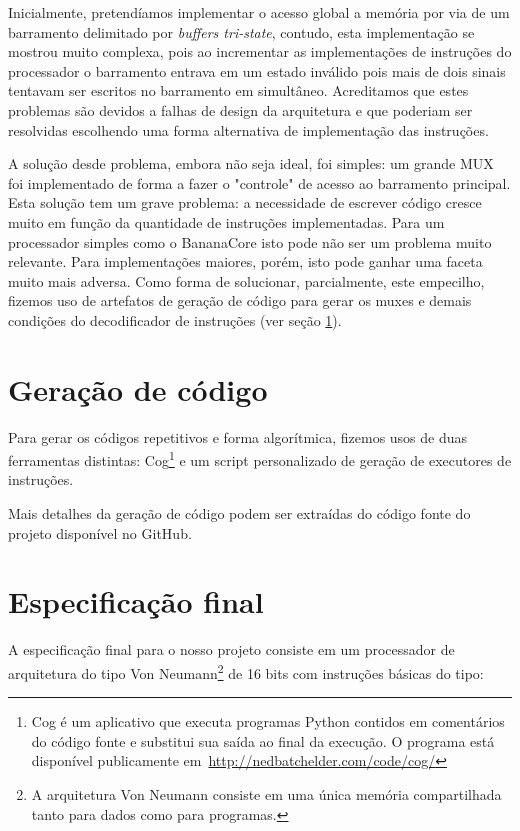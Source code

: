 \documentclass[11pt]{report}
\begin{document}
Inicialmente, pretendíamos implementar o acesso global a memória por via de um barramento delimitado por \emph{buffers tri-state}, contudo, esta implementação se mostrou muito complexa, pois ao incrementar as implementações de instruções do processador o barramento entrava em um estado inválido pois mais de dois sinais tentavam ser escritos no barramento em simultâneo. Acreditamos que estes problemas são devidos a falhas de design da arquitetura e que poderiam ser resolvidas escolhendo uma forma alternativa de implementação das instruções.

A solução desde problema, embora não seja ideal, foi simples: um grande MUX foi implementado de forma a fazer o "controle" de acesso ao barramento principal. Esta solução tem um grave problema: a necessidade de escrever código cresce muito em função da quantidade de instruções implementadas. Para um processador simples como o BananaCore isto pode não ser um problema muito relevante. Para implementações maiores, porém, isto pode ganhar uma faceta muito mais adversa. Como forma de solucionar, parcialmente, este empecilho, fizemos uso de artefatos de geração de código para gerar os muxes e demais condições do decodificador de instruções (ver seção \ref{sec:CodeGeneration}).


\section{Geração de código}
\label{sec:CodeGeneration}
Para gerar os códigos repetitivos e forma algorítmica, fizemos usos de duas ferramentas distintas: Cog\footnote{Cog é um aplicativo que executa programas Python contidos em comentários do código fonte e substitui sua saída ao final da execução. O programa está disponível publicamente \mbox{em \url{http://nedbatchelder.com/code/cog/}}} e um script personalizado de geração de executores de instruções.

Mais detalhes da geração de código podem ser extraídas do código fonte do projeto disponível no GitHub.


\section{Especificação final}
A especificação final para o nosso projeto consiste em um processador de arquitetura do tipo Von Neumann\footnote{A arquitetura Von Neumann consiste em uma única memória compartilhada tanto para dados como para programas.} de 16 bits com instruções básicas do tipo:
\end{document}
